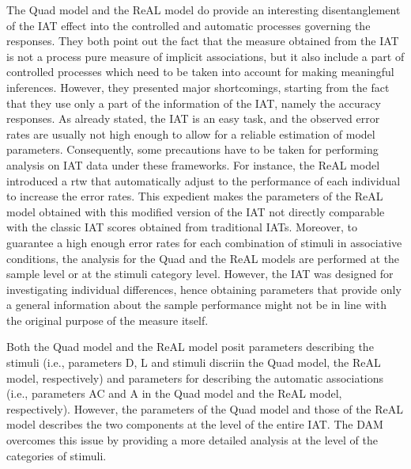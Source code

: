 \documentclass[12pt]{book}
\begin{document}
The Quad model and the ReAL model do provide an interesting disentanglement of the IAT effect into the controlled and automatic processes governing the responses. They both point out the fact that the measure obtained from the IAT is not a process pure measure of implicit associations, but it also include a part of controlled processes which need to be taken into account for making meaningful inferences. 
However, they presented major shortcomings, starting from the fact that they use only a part of the information of the IAT, namely the accuracy responses. As already stated, the IAT is an easy task, and the observed error rates are usually not high enough to allow for a reliable estimation of model parameters. Consequently, some precautions have to be taken for performing analysis on IAT data under these frameworks. 
For instance, the ReAL model introduced a rtw that automatically adjust  to the performance of each individual to increase the error rates. 
This expedient makes the parameters of the ReAL model obtained with this modified version of the IAT not directly comparable with the classic IAT scores obtained from traditional IATs. Moreover, to guarantee a high enough error rates for each combination of stimuli in associative conditions, the analysis for the Quad and the ReAL models are performed at the sample level or at the stimuli category level. However, the IAT was designed for investigating individual differences, hence obtaining parameters that provide only a general information about the sample performance might not be in line with the original purpose of the measure itself. 

Both the Quad model and the ReAL model  posit parameters describing the stimuli (i.e., parameters D, L and stimuli discriin the Quad model, the ReAL model, respectively) and parameters for describing the automatic associations (i.e., parameters AC and A in the Quad model and the ReAL model, respectively). 
	However, the parameters of the Quad model and those of the ReAL model describes the two components at the level of the entire IAT. 
	The DAM overcomes this issue by providing a more detailed analysis at the level of the categories of stimuli.
\end{document}
